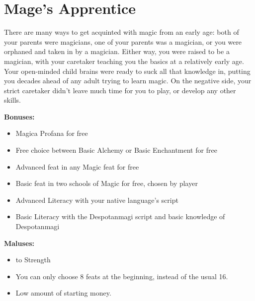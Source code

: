 \section{Mage's Apprentice}
There are many ways to get acquinted with magic from an early age: both of your parents were magicians, one of your parents was a magician, or you were orphaned and taken in by a magician. Either way, you were raised to be a magician, with your caretaker teaching you the basics at a relatively early age. Your open-minded child brains were ready to suck all that knowledge in, putting you decades ahead of any adult trying to learn magic. On the negative side, your strict caretaker didn't leave much time for you to play, or develop any other skills.


\textbf{Bonuses:}
\begin{itemize}
	\item Magica Profana for free
	\item Free choice between Basic Alchemy or Basic Enchantment for free
	\item Advanced feat in any Magic feat  for free
	\item Basic feat in two schools of Magic for free, chosen by player
	\item Advanced Literacy with your native language's script
	\item Basic Literacy with the Despotanmagi script and basic knowledge of Despotanmagi 
\end{itemize}


\textbf{Maluses:}
\begin{itemize}
	\item {} to Strength
	\item You can only choose 8 feats at the beginning, instead of the usual 16.
	\item Low amount of starting money.
\end{itemize}
